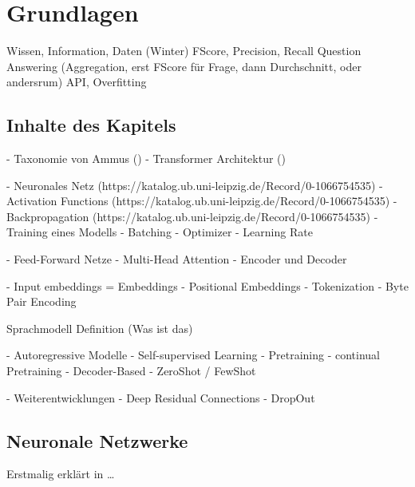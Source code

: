 \chapter{Grundlagen}\label{ch:preliminaries}

Wissen, Information, Daten (Winter)
FScore, Precision, Recall
Question Answering (Aggregation, erst FScore für Frage, dann Durchschnitt, oder andersrum)
API, Overfitting


\section*{Inhalte des Kapitels}
- Taxonomie von Ammus (\citet{ammus})
- Transformer Architektur (\citet{attention})

- Neuronales Netz (https://katalog.ub.uni-leipzig.de/Record/0-1066754535)
- Activation Functions (https://katalog.ub.uni-leipzig.de/Record/0-1066754535)
- Backpropagation (https://katalog.ub.uni-leipzig.de/Record/0-1066754535)
- Training eines Modells
    - Batching
    - Optimizer
    - Learning Rate

- Feed-Forward Netze
- Multi-Head Attention
- Encoder und Decoder

- Input embeddings = Embeddings
- Positional Embeddings
- Tokenization
    - Byte Pair Encoding


Sprachmodell Definition (Was ist das)

- Autoregressive Modelle
    - Self-supervised Learning
    - Pretraining
    - continual Pretraining
    - Decoder-Based
    - ZeroShot / FewShot

- Weiterentwicklungen
    - Deep Residual Connections
    - DropOut


\section{Neuronale Netzwerke}
Erstmalig erklärt in \dots

